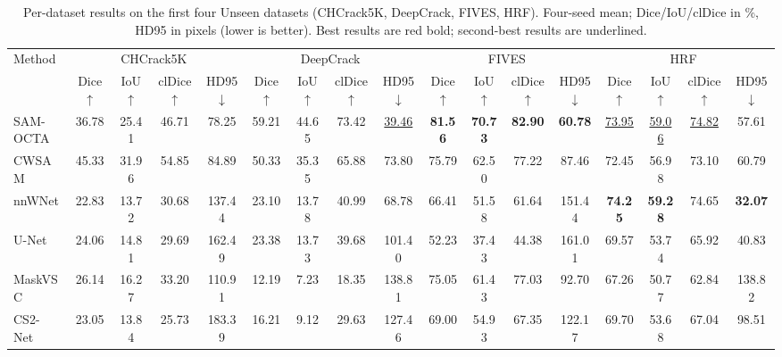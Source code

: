 \begin{table}[t]
\centering
\caption{Per-dataset results on the first four Unseen datasets (CHCrack5K, DeepCrack, FIVES, HRF). Four-seed mean; Dice/IoU/clDice in \%, HD95 in pixels (lower is better). Best results are red bold; second-best results are underlined.}
\label{tab:per_dataset_unseen_i}
\tiny
\setlength{\tabcolsep}{1.5pt}
\begin{tabular*}{\textwidth}{@{\extracolsep{\fill}}lcccccccccccccccc@{}}
\toprule
Method & \multicolumn{4}{c}{CHCrack5K~\cite{chen2025hacnetv2}} & \multicolumn{4}{c}{DeepCrack~\cite{liu2019deepcrack}} & \multicolumn{4}{c}{FIVES~\cite{jin2022fives}} & \multicolumn{4}{c}{HRF~\cite{budai2013robust}} \\
\cmidrule(lr){2-5}
\cmidrule(lr){6-9}
\cmidrule(lr){10-13}
\cmidrule(lr){14-17}
 & Dice $\uparrow$ & IoU $\uparrow$ & clDice $\uparrow$ & HD95 $\downarrow$ & Dice $\uparrow$ & IoU $\uparrow$ & clDice $\uparrow$ & HD95 $\downarrow$ & Dice $\uparrow$ & IoU $\uparrow$ & clDice $\uparrow$ & HD95 $\downarrow$ & Dice $\uparrow$ & IoU $\uparrow$ & clDice $\uparrow$ & HD95 $\downarrow$ \\
\midrule
SAM-OCTA~\cite{wang2024sam_octa} & 36.78 & 25.41 & 46.71 & 78.25 & 59.21 & 44.65 & 73.42 & \underline{39.46} & \textcolor{red!80!black}{\textbf{81.56}} & \textcolor{red!80!black}{\textbf{70.73}} & \textcolor{red!80!black}{\textbf{82.90}} & \textcolor{red!80!black}{\textbf{60.78}} & \underline{73.95} & \underline{59.06} & \underline{74.82} & 57.61 \\
CWSAM~\cite{pu2025cwsam} & 45.33 & 31.96 & 54.85 & 84.89 & 50.33 & 35.35 & 65.88 & 73.80 & 75.79 & 62.50 & 77.22 & 87.46 & 72.45 & 56.98 & 73.10 & 60.79 \\
nnWNet~\cite{zhou2025nnwnet} & 22.83 & 13.72 & 30.68 & 137.44 & 23.10 & 13.78 & 40.99 & 68.78 & 66.41 & 51.58 & 61.64 & 151.44 & \textcolor{red!80!black}{\textbf{74.25}} & \textcolor{red!80!black}{\textbf{59.28}} & 74.65 & \textcolor{red!80!black}{\textbf{32.07}} \\
U-Net~\cite{ronneberger2015unet} & 24.06 & 14.81 & 29.69 & 162.49 & 23.38 & 13.73 & 39.68 & 101.40 & 52.23 & 37.43 & 44.38 & 161.01 & 69.57 & 53.74 & 65.92 & 40.83 \\
MaskVSC~\cite{zhou2025maskvsc} & 26.14 & 16.27 & 33.20 & 110.91 & 12.19 & 7.23 & 18.35 & 138.81 & 75.05 & 61.43 & 77.03 & 92.70 & 67.26 & 50.77 & 62.84 & 138.82 \\
CS2-Net~\cite{mou2021cs2net} & 23.05 & 13.84 & 25.73 & 183.39 & 16.21 & 9.12 & 29.63 & 127.46 & 69.00 & 54.93 & 67.35 & 122.17 & 69.70 & 53.68 & 67.04 & 98.51 \\

\end{tabular*}
\end{table}
